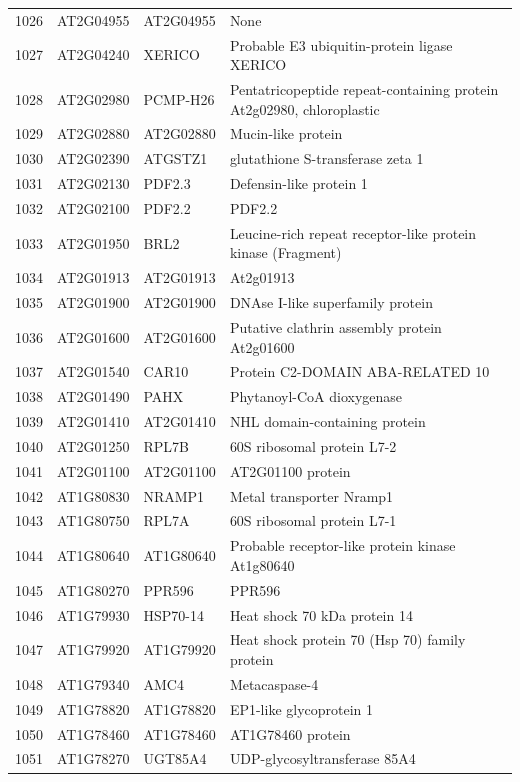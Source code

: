\documentclass[11pt]{article}
\begin{document}
\begin{center}
\begin{tabular}{rlll}
1026 & AT2G04955 & AT2G04955 & None\\
1027 & AT2G04240 & XERICO & Probable E3 ubiquitin-protein ligase XERICO\\
1028 & AT2G02980 & PCMP-H26 & Pentatricopeptide repeat-containing protein At2g02980, chloroplastic\\
1029 & AT2G02880 & AT2G02880 & Mucin-like protein\\
1030 & AT2G02390 & ATGSTZ1 & glutathione S-transferase zeta 1\\
1031 & AT2G02130 & PDF2.3 & Defensin-like protein 1\\
1032 & AT2G02100 & PDF2.2 & PDF2.2\\
1033 & AT2G01950 & BRL2 & Leucine-rich repeat receptor-like protein kinase (Fragment)\\
1034 & AT2G01913 & AT2G01913 & At2g01913\\
1035 & AT2G01900 & AT2G01900 & DNAse I-like superfamily protein\\
1036 & AT2G01600 & AT2G01600 & Putative clathrin assembly protein At2g01600\\
1037 & AT2G01540 & CAR10 & Protein C2-DOMAIN ABA-RELATED 10\\
1038 & AT2G01490 & PAHX & Phytanoyl-CoA dioxygenase\\
1039 & AT2G01410 & AT2G01410 & NHL domain-containing protein\\
1040 & AT2G01250 & RPL7B & 60S ribosomal protein L7-2\\
1041 & AT2G01100 & AT2G01100 & AT2G01100 protein\\
1042 & AT1G80830 & NRAMP1 & Metal transporter Nramp1\\
1043 & AT1G80750 & RPL7A & 60S ribosomal protein L7-1\\
1044 & AT1G80640 & AT1G80640 & Probable receptor-like protein kinase At1g80640\\
1045 & AT1G80270 & PPR596 & PPR596\\
1046 & AT1G79930 & HSP70-14 & Heat shock 70 kDa protein 14\\
1047 & AT1G79920 & AT1G79920 & Heat shock protein 70 (Hsp 70) family protein\\
1048 & AT1G79340 & AMC4 & Metacaspase-4\\
1049 & AT1G78820 & AT1G78820 & EP1-like glycoprotein 1\\
1050 & AT1G78460 & AT1G78460 & AT1G78460 protein\\
1051 & AT1G78270 & UGT85A4 & UDP-glycosyltransferase 85A4\\

\end{tabular}
\end{center}
\end{document}
